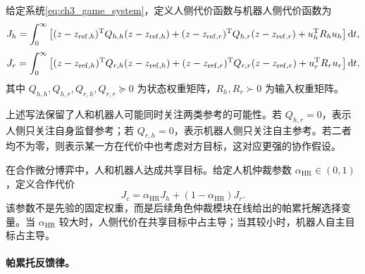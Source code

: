 \begin{definition}[人侧目标和机器人侧目标代价函数]
\label{def:ch3_costs}
给定系统\eqref{eq:ch3_game_system}，定义人侧代价函数与机器人侧代价函数为
\begin{equation}
  J_h=\int_0^\infty\left[(z-z_{\mathrm{ref},h})^{\mathrm{T}}Q_{h,h}(z-z_{\mathrm{ref},h})+(z-z_{\mathrm{ref},r})^{\mathrm{T}}Q_{h,r}(z-z_{\mathrm{ref},r})+u_h^{\mathrm{T}}R_hu_h\right]\mathrm{d} t,
  \label{eq:ch3_Jh_game}
\end{equation}
\begin{equation}
  J_r=\int_0^\infty\left[(z-z_{\mathrm{ref},h})^{\mathrm{T}}Q_{r,h}(z-z_{\mathrm{ref},h})+(z-z_{\mathrm{ref},r})^{\mathrm{T}}Q_{r,r}(z-z_{\mathrm{ref},r})+u_r^{\mathrm{T}}R_ru_r\right]\mathrm{d} t,
  \label{eq:ch3_Jr_game}
\end{equation}
其中 $Q_{h,h},Q_{h,r},Q_{r,h},Q_{r,r}\succeq0$ 为状态权重矩阵，$R_h,R_r\succ0$ 为输入权重矩阵。
\end{definition}

上述写法保留了人和机器人可能同时关注两类参考的可能性。若 $Q_{h,r}=0$，表示人侧只关注自身监督参考；若 $Q_{r,h}=0$，表示机器人侧只关注自主参考。若二者均不为零，则表示某一方在代价中也考虑对方目标，这对应更强的协作假设。

在合作微分博弈中，人和机器人达成共享目标。给定人机仲裁参数 $\alpha_{\mathrm{HR}}\in(0,1)$，定义合作代价
\begin{equation}
  J_c=\alpha_{\mathrm{HR}}J_h+(1-\alpha_{\mathrm{HR}})J_r .
  \label{eq:ch3_Jc_game}
\end{equation}
该参数不是先验的固定权重，而是后续角色仲裁模块在线给出的帕累托解选择变量。当 $\alpha_{\mathrm{HR}}$ 较大时，人侧代价在共享目标中占主导；当其较小时，机器人自主目标占主导。

\paragraph{帕累托反馈律。}
\label{subsec:ch3_pareto_game_law}

